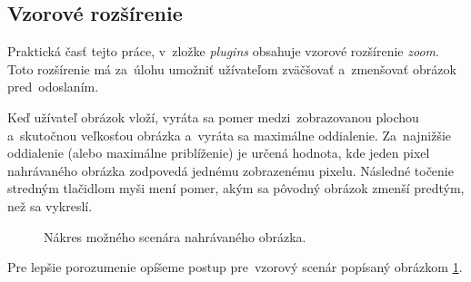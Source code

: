 \subsection{Vzorové rozšírenie}
\label{sec:vzorove-rozsirenie}

Praktická časť tejto práce, v~zložke \emph{plugins} obsahuje vzorové rozšírenie \emph{zoom}. Toto rozšírenie má za~úlohu umožniť užívateľom zväčšovať a~zmenšovať obrázok pred~odoslaním.

Keď užívateľ obrázok vloží, vyráta sa pomer medzi~zobrazovanou plochou a~skutočnou veľkosťou obrázka a~vyráta sa maximálne oddialenie. Za~najnižšie oddialenie (alebo maximálne priblíženie) je určená hodnota, kde jeden pixel nahrávaného obrázka zodpovedá jednému zobrazenému pixelu. Následné točenie stredným tlačidlom myši mení pomer, akým sa pôvodný obrázok zmenší predtým, než sa vykreslí.

\begin{figure}[!hb]
	\centering
	\caption{Nákres možného scenára nahrávaného obrázka.}
	\label{fig:zoom-scenar}
\end{figure}

Pre lepšie porozumenie opíšeme postup pre~vzorový scenár popísaný obrázkom \ref{fig:zoom-scenar}. 

